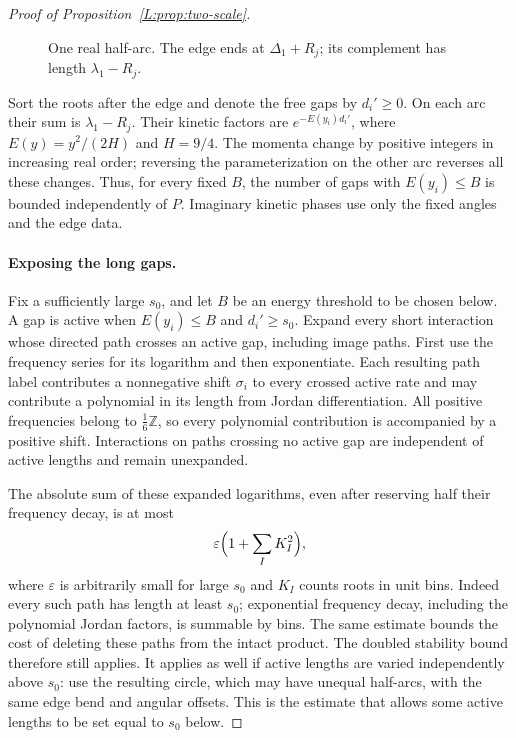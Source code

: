 \documentclass[11pt]{article}
\numberwithin{equation}{section}
\theoremstyle{definition}\newtheorem{definition}[theorem]{Definition}
\theoremstyle{remark}\newtheorem{remark}[theorem]{Remark}
\begin{document}
\begin{proof}[Proof of Proposition~\ref{L:prop:two-scale}]
\begin{figure}[htbp]
\caption{One real half-arc. The edge ends at $\Delta_1+R_j$;
its complement has length $\lambda_1-R_j$.}
\label{L:fig:two-scale}
\end{figure}

Sort the roots after the edge and denote the free gaps by $d_i'\ge0$.
On each arc their sum is $\lambda_1-R_j$. Their kinetic factors are
$e^{-E(y_i)d_i'}$, where $E(y)=y^2/(2H)$ and $H=9/4$. The momenta
change by positive integers in increasing real order; reversing the
parameterization on the other arc reverses all these changes. Thus,
for every fixed $B$, the number of gaps with $E(y_i)\le B$ is bounded
independently of $P$. Imaginary kinetic phases use only the fixed
angles and the edge data.

\paragraph{Exposing the long gaps.}
Fix a sufficiently large $s_0$, and let $B$ be an energy threshold to
be chosen below. A gap is active when
$E(y_i)\le B$ and $d_i'\ge s_0$. Expand every short interaction whose
directed path crosses an active gap, including image paths. First use
the frequency series for its logarithm and then exponentiate. Each
resulting path label contributes a nonnegative shift $\sigma_i$ to
 every crossed active rate and may contribute a polynomial in its
length from Jordan differentiation. All positive frequencies belong
to $\tfrac16\mathbb Z$, so every polynomial contribution is accompanied
by a positive shift. Interactions on paths crossing no active gap are
independent of active lengths and remain unexpanded.

The absolute sum of these expanded logarithms, even after reserving
half their frequency decay, is at most
\[
       \varepsilon\Bigl(1+\sum_I K_I^2\Bigr),
\]
where $\varepsilon$ is arbitrarily small for large $s_0$ and $K_I$
counts roots in unit bins. Indeed every such path has length at least
$s_0$; exponential frequency decay, including the polynomial Jordan
factors, is summable by bins. The same estimate bounds the cost of
deleting these paths from the intact product. The doubled stability
bound therefore still applies. It applies as well if active lengths
are varied independently above $s_0$: use the resulting circle, which
may have unequal half-arcs, with the same edge bend and angular
offsets. This is the estimate that allows some active lengths to be
set equal to $s_0$ below.


\end{proof}
\end{document}
